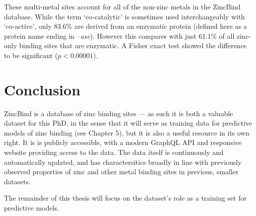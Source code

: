 These multi-metal sites account for all of the non-zinc metals in the ZincBind database. While the term `co-catalytic' is sometimes used interchangeably with `co-active', only 83.6\% are derived from an enzymatic protein (defined here as a protein name ending in \emph{--ase}). However this compares with just 61.1\% of all zinc-only binding sites that are enzymatic. A Fisher exact test showed the difference to be significant ($p<0.00001$).

\section{Conclusion}

ZincBind is a database of zinc binding sites --- as such it is both a valuable dataset for this PhD, in the sense that it will serve as training data for predictive models of zinc binding (see Chapter 5), but it is also a useful resource in its own right. It is is publicly accessible, with a modern GraphQL API and responsive website providing access to the data. The data itself is continuously and automatically updated, and has charactersitics broadly in line with previously observed properties of zinc and other metal binding sites in previous, smaller datasets.

The remainder of this thesis will focus on the dataset's role as a training set for predictive models.